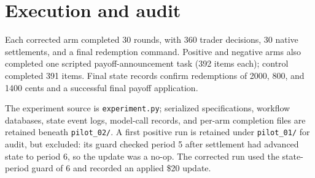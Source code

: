 \documentclass[11pt]{article}
\begin{document}
\section{Execution and audit}
Each corrected arm completed 30 rounds, with 360 trader decisions, 30 native
settlements, and a final redemption command. Positive and negative arms also
completed one scripted payoff-announcement task (392 items each); control
completed 391 items. Final state records confirm redemptions of 2000, 800, and
1400 cents and a successful final payoff application.

The experiment source is \texttt{experiment.py}; serialized specifications,
workflow databases, state event logs, model-call records, and per-arm completion
files are retained beneath \texttt{pilot\_02/}. A first positive run is retained
under \texttt{pilot\_01/} for audit, but excluded: its guard checked period 5
after settlement had advanced state to period 6, so the update was a no-op.
The corrected run used the state-period guard of 6 and recorded an applied
\$20 update.
\end{document}

